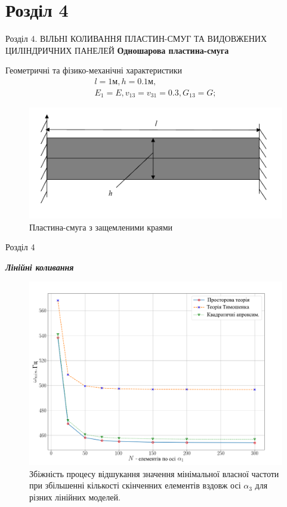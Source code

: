 \documentclass[handout, 8pt]{beamer}
\numberwithin{figure}{section}
\numberwithin{equation}{section}
\numberwithin{table}{section}
\begin{document}
\section{Розділ 4}
\begin{frame}{Розділ 4. ВІЛЬНІ КОЛИВАННЯ ПЛАСТИН-СМУГ ТА ВИДОВЖЕНИХ ЦИЛІНДРИЧНИХ ПАНЕЛЕЙ}
\textbf{Одношарова пластина-смуга}
\vspace{1em}

Геометричні та фізико-механічні характеристики
\begin{equation}
\begin{gathered}
l=1\text{м}, h=0.1\text{м},\\
E_1=E, v_{13}=v_{31}=0.3, G_{13}=G;
\end{gathered}
\end{equation}
\begin{figure}
	\includegraphics[scale=0.3]{pic/plate.png}
		\caption{Пластина-смуга з защемленими краями}
		\label{fig:plate}
\end{figure}



\end{frame}

\begin{frame}{Розділ 4}

\textbf{\textit{Лінійні коливання}}
\begin{figure}
	\includegraphics[scale=0.3]{pic/conv_allukr2.png}
		\caption{Збіжність процесу відшукання значення мінімальної власної частоти при збільшенні кількості скінченних елементів вздовж осі $\alpha_3$ для різних лінійних моделей.}
		\label{fig:EE31}
\end{figure}

\end{frame}
\end{document}
